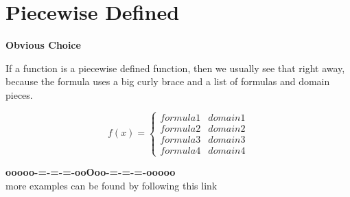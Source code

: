 \documentclass{ximera}
\begin{document}
\section*{Piecewise Defined}


\textbf{\textcolor{purple!85!blue}{Obvious Choice}} 

If a function is a piecewise defined function, then we usually see that right away, because the formula uses a big curly brace and a list of formulas and domain pieces.




\[
f(x) = 
\begin{cases}
  formula 1 & domain 1  \\
  formula 2 & domain 2  \\
  formula 3 & domain 3  \\
  formula 4 & domain 4  
\end{cases}
\]







\begin{onlineOnly}
\begin{center}
\textbf{\textcolor{green!50!black}{ooooo-=-=-=-ooOoo-=-=-=-ooooo}} \\

more examples can be found by following this link\\ 

\end{center}
\end{onlineOnly}
\end{document}
